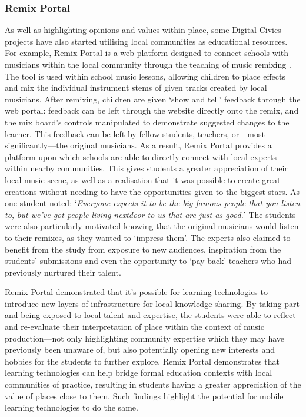 \subsubsection{Remix Portal}

As well as highlighting opinions and values within place, some Digital Civics projects have also started utilising local communities as educational resources. For example, Remix Portal is a web platform designed to connect schools with musicians within the local community through the teaching of music remixing \citep{Dodds2017}. The tool is used within school music lessons, allowing children to place effects and mix the individual instrument stems of given tracks created by local musicians. After remixing, children are given `show and tell' feedback through the web portal: feedback can be left through the website directly onto the remix, and the mix board's controls manipulated to demonstrate suggested changes to the learner. This feedback can be left by fellow students, teachers, or---most significantly---the original musicians. As a result, Remix Portal provides a platform upon which schools are able to directly connect with local experts within nearby communities. This gives students a greater appreciation of their local music scene, as well as a realisation that it was possible to create great creations without needing to have the opportunities given to the biggest stars. As one student noted: `\textit{Everyone expects it to be the big famous people that you listen to, but we've got people living nextdoor to us that are just as good.}' The students were also particularly motivated knowing that the original musicians would listen to their remixes, as they wanted to `impress them'. The experts also claimed to benefit from the study from exposure to new audiences, inspiration from the students' submissions and even the opportunity to `pay back' teachers who had previously nurtured their talent.

Remix Portal demonstrated that it's possible for learning technologies to introduce new layers of infrastructure for local knowledge sharing. By taking part and being exposed to local talent and expertise, the students were able to reflect and re-evaluate their interpretation of place within the context of music production---not only highlighting community expertise which they may have previously been unaware of, but also potentially opening new interests and hobbies for the students to further explore. Remix Portal demonstrates that learning technologies can help bridge formal education contexts with local communities of practice, resulting in students having a greater appreciation of the value of places close to them. Such findings highlight the potential for mobile learning technologies to do the same.

